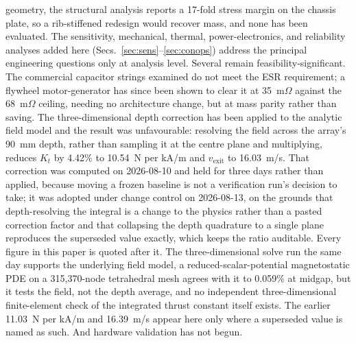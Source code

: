 \documentclass[conference]{IEEEtran}
\begin{document}
geometry, the structural analysis reports a 17-fold stress margin on the chassis plate, so a rib-stiffened redesign would recover mass, and none has been evaluated. The sensitivity, mechanical, thermal, power-electronics, and reliability analyses added here (Secs.~\ref{sec:sens}--\ref{sec:conops}) address the principal engineering questions only at analysis level. Several remain feasibility-significant. The commercial capacitor strings examined do not meet the ESR requirement; a flywheel motor-generator has since been shown to clear it at 35~m$\Omega$ against the 68~m$\Omega$ ceiling, needing no architecture change, but at mass parity rather than saving. The three-dimensional depth correction has been applied to the analytic field model and the result was unfavourable: resolving the field across the array's 90~mm depth, rather than sampling it at the centre plane and multiplying, reduces $K_t$ by 4.42\% to 10.54~N per kA/m and $v_\mathrm{exit}$ to 16.03~m/s. That correction was computed on 2026-08-10 and held for three days rather than applied, because moving a frozen baseline is not a verification run's decision to take; it was adopted under change control on 2026-08-13, on the grounds that depth-resolving the integral is a change to the physics rather than a pasted correction factor and that collapsing the depth quadrature to a single plane reproduces the superseded value exactly, which keeps the ratio auditable. Every figure in this paper is quoted after it. The three-dimensional solve run the same day supports the underlying field model, a reduced-scalar-potential magnetostatic PDE on a 315{,}370-node tetrahedral mesh agrees with it to 0.059\% at midgap, but it tests the field, not the depth average, and no independent three-dimensional finite-element check of the integrated thrust constant itself exists. The earlier 11.03~N per kA/m and 16.39~m/s appear here only where a superseded value is named as such. And hardware validation has not begun.
\end{document}
